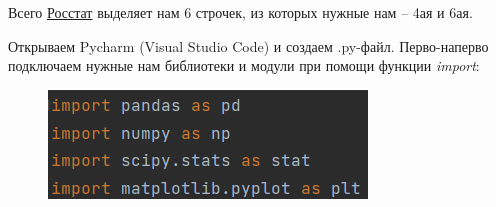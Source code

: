 Всего %
\href{https://showdata.gks.ru/finder/descriptors/278928}{Росстат} выделяет нам 6 строчек, из которых нужные нам -- 4ая и 6ая.

Открываем Pycharm (Visual Studio Code) и создаем .py-файл. Перво-наперво подключаем нужные нам библиотеки и модули при помощи функции \textit{import}:

\begin{figure}[H]
	\begin{center}
		\includegraphics{include/fig/import}
	\end{center}
\end{figure}

